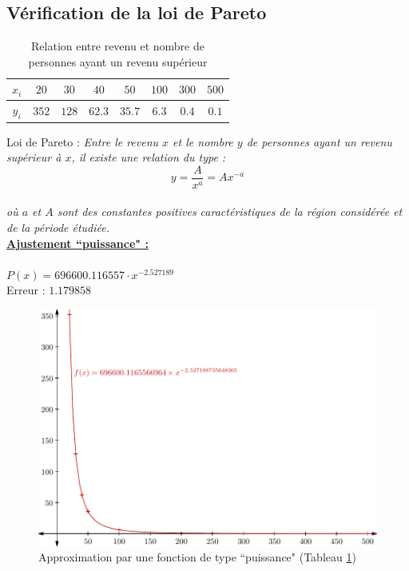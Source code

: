 \documentclass{report}
\begin{document}
      \newpage
      \subsection{Vérification de la loi de Pareto}
	\begin{table}[h]
	  \centering
	  \begin{tabular}{| c | c | c | c | c | c | c | c |}
	      \hline 
	      $x_{i}$ & $20$ & $30$ & $40$ & $50$ & $100$ & $300$ & $500$ \\ 
	      \hline 
	      $y_{i}$ & $352$ & $128$ & $62.3$ & $35.7$ & $6.3$ & $0.4$ & $0.1$ \\ 
	      \hline 
	  \end{tabular}
	  \caption{Relation entre revenu et nombre de personnes ayant un revenu supérieur}
	  \label{approx_tp2_ex5}
	\end{table}
	
	Loi de Pareto : \textit{Entre le revenu $x$ et le nombre $y$ de personnes ayant un revenu supérieur à $x$, il existe une relation du type :} \[ y=\frac{A}{x^{a}}=Ax^{-a} \]\\
	\textit{où $a$ et $A$ sont des constantes positives caractéristiques de la région considérée et de la période étudiée.}\\
	
	\noindent\underline{\textbf{Ajustement ``puissance" :}}\\ \\
	$P(x) = 696600.116557\cdot x^{-2.527189}$\\
	Erreur : $1.179858$
	\newline
	\begin{figure}[h]
	  \centering
	  \includegraphics[scale=0.75]{graphiques/pdf_output/reglin_tp2_ex5.pdf}
	  \caption{Approximation par une fonction de type ``puissance" (Tableau \ref{approx_tp2_ex5})}
        \end{figure}
        
\end{document}
